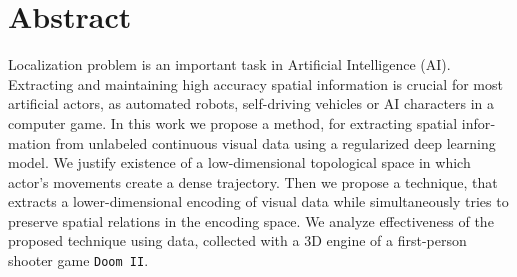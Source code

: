 
\chapter{Abstract}

\begin{english}

Localization problem is an important task in Artificial Intelligence (AI).
Extracting and maintaining high accuracy spatial information is crucial for most artificial actors, as automated robots, self-driving vehicles or AI characters in a computer game.
In this work we propose a method, for extracting spatial information from unlabeled continuous visual data using a regularized deep learning model.
We justify existence of a low-dimensional topological space in which actor's movements create a dense trajectory.
Then we propose a technique, that extracts a lower-dimensional encoding of visual data while simultaneously  tries to preserve spatial relations in the encoding space.
We analyze effectiveness of the proposed technique using data, collected with a 3D engine of a first-person shooter game \texttt{Doom II}.

\end{english}
